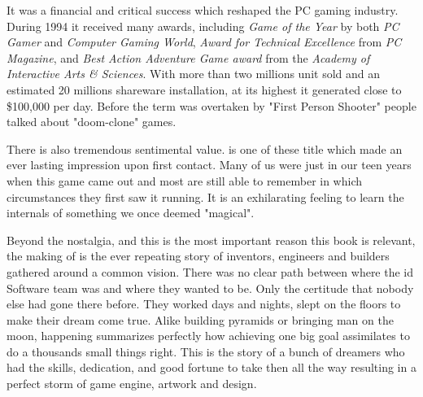 It was a financial and critical success which reshaped the PC gaming industry. During 1994 it received many awards, including \textit{Game of the Year} by both \textit{PC Gamer} and \textit{Computer Gaming World}, \textit{Award for Technical Excellence} from \textit{PC Magazine}, and \textit{Best Action Adventure Game award} from the \textit{Academy of Interactive Arts \& Sciences}. With more than two millions unit sold and an estimated 20 millions shareware installation, at its highest it generated close to \$100,000 per day. Before the term was overtaken by "First Person Shooter" people talked about "doom-clone" games.\\
 \par
 \par
There is also tremendous sentimental value. \doom is one of these title which made an ever lasting impression upon first contact. Many of us were just in our teen years when this game came out and most are still able to remember in which circumstances they first saw it running. It is an exhilarating feeling to learn the internals of something we once deemed "magical".\\
\par


Beyond the nostalgia, and this is the most important reason this book is relevant, the making of \doom is the ever repeating story of inventors, engineers and builders gathered around a common vision. There was no clear path between where the id Software team was and where they wanted to be. Only the certitude that nobody else had gone there before. They worked days and nights, slept on the floors to make their dream come true. Alike building pyramids or bringing man on the moon, \doom happening summarizes perfectly how achieving one big goal assimilates to do a thousands small things right. This is the story of a bunch of dreamers who had the skills, dedication, and good fortune to take then all the way resulting in a perfect storm of game engine, artwork and design.\\
\par




